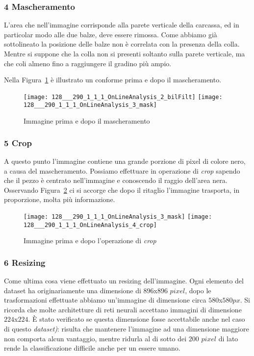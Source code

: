 \subsubsection{4 Mascheramento}
L'area che nell'immagine corrisponde alla parete verticale della carcassa, ed in particolar modo alle due balze, deve essere rimossa.
Come abbiamo già sottolineato la posizione delle balze non è correlata con la presenza della colla.
Mentre si suppone che la colla non si presenti soltanto sulla parete verticale, ma che coli almeno fino a raggiungere il gradino più ampio.

Nella Figura~\ref{fig:mask} è illustrato un conforme prima e dopo il mascheramento.

\begin{figure}[ht] %
  \begin{center}
    \texttt{[image: 128\_\_\_290\_1\_1\_1\_OnLineAnalysis\_2\_bilFilt]}
    \texttt{[image: 128\_\_\_290\_1\_1\_1\_OnLineAnalysis\_3\_mask]}
    \caption{Immagine prima e dopo il mascheramento}
    \label{fig:mask}
  \end{center}
\end{figure}

\subsubsection{5 Crop}
A questo punto l'immagine contiene una grande porzione di pixel di colore nero, a causa del mascheramento.
Possiamo effettuare in operazione di \textit{crop} sapendo che il pezzo è centrato nell'immagine e conoscendo il raggio dell'area nera.
Osservando Figura~\ref{fig:crop} ci si accorge che dopo il ritaglio l'immagine trasporta, in proporzione, molta più informazione.

\begin{figure}[ht] %
  \begin{center}
    \texttt{[image: 128\_\_\_290\_1\_1\_1\_OnLineAnalysis\_3\_mask]}
    \texttt{[image: 128\_\_\_290\_1\_1\_1\_OnLineAnalysis\_4\_crop]}
    \caption{Immagine prima e dopo l'operazione di \textit{crop}}
    \label{fig:crop}
  \end{center}
\end{figure}

\subsubsection{6 Resizing}
Come ultima cosa viene effettuato un resizing dell'immagine.
Ogni elemento del dataset ha originariamente una dimensione di $896$x$896$ $pixel$, dopo le trasformazioni effettuate abbiamo un'immagine di dimensione circa $580$x$580px$.
Si ricorda che molte architetture di reti neurali accettano immagini di dimensione $224$x$224$.
È stato verificato se questa dimensione fosse accettabile anche nel caso di questo \textit{dataset)}: risulta che mantenere l'immagine ad una dimensione maggiore non comporta alcun vantaggio, mentre ridurla al di sotto dei $200$ $pixel$ di lato rende la classificazione difficile anche per un essere umano.

